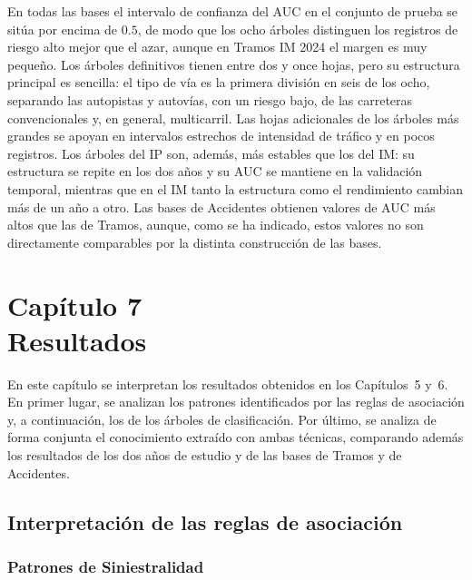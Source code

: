 \documentclass[twoside,a4paper,12pt,onecolumn,openany]{book}
\begin{document}
En todas las bases el intervalo de confianza del AUC en el conjunto de prueba se sitúa por encima de $0.5$, de modo que los ocho árboles distinguen los registros de riesgo alto mejor que el azar, aunque en Tramos IM 2024 el margen es muy pequeño. Los árboles definitivos tienen entre dos y once hojas, pero su estructura principal es sencilla: el tipo de vía es la primera división en seis de los ocho, separando las autopistas y autovías, con un riesgo bajo, de las carreteras convencionales y, en general, multicarril. Las hojas adicionales de los árboles más grandes se apoyan en intervalos estrechos de intensidad de tráfico y en pocos registros. Los árboles del IP son, además, más estables que los del IM: su estructura se repite en los dos años y su AUC se mantiene en la validación temporal, mientras que en el IM tanto la estructura como el rendimiento cambian más de un año a otro. Las bases de Accidentes obtienen valores de AUC más altos que las de Tramos, aunque, como se ha indicado, estos valores no son directamente comparables por la distinta construcción de las bases.
 

\setcounter{chapter}{7}
\chapter*{Capítulo 7 \\ \vspace{1cm} Resultados}

\setcounter{section}{0}
\setcounter{subsection}{0}
\setcounter{figure}{0}\setcounter{table}{0}

En este capítulo se interpretan los resultados obtenidos en los Capítulos~5 y~6. En primer lugar, se analizan los patrones identificados por las reglas de asociación y, a continuación, los de los árboles de clasificación. Por último, se analiza de forma conjunta el conocimiento extraído con ambas técnicas, comparando además los resultados de los dos años de estudio y de las bases de Tramos y de Accidentes.

\section{Interpretación de las reglas de asociación}

\subsection{Patrones de Siniestralidad}
\end{document}

